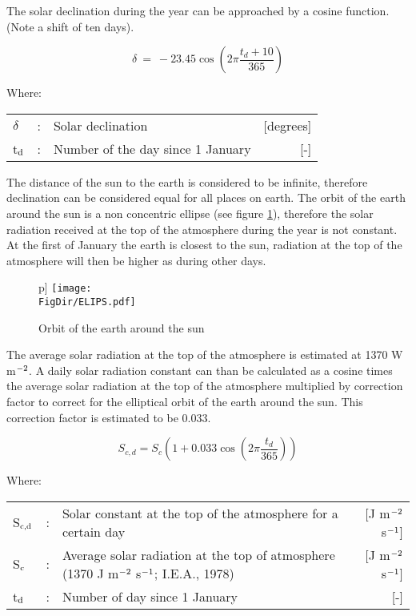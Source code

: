 The solar declination during the year can be approached by a cosine function. (Note a shift of ten days).

\begin{equation}
\delta ~=~ -23.45 \cos ( 2 \pi {\frac{t _{d} + 10}{365}} )
\end{equation}

Where:\\[5pt]
\begin{tabularx}{\textwidth}{llXr}
$\delta$ &:& Solar declination   & [de\-grees]\\
t$_{{\rm d}}$ &:& Number of the day since 1 January   & [-]\\
\end{tabularx}

The distance of the sun to the earth is considered to be infinite, therefore declination 
can be considered equal for all places on earth. The orbit of the earth around the sun is a
non concentric ellipse (see figure \ref{fig:orbit}), therefore the solar radiation received 
at the top of the atmosphere during the year is not constant. At the first of January the 
earth is closest to the sun, radiation at the top of the atmosphere will then be higher as 
during other days.

\begin{figure}p]
\centering
\texttt{[image: \\FigDir/ELIPS.pdf]}
\caption{Orbit of the earth around the sun}
\label{fig:orbit}
\end{figure}

The average solar radiation at the top of the atmosphere is estimated at 1370 W m$^{\rm -2}$. A daily solar radiation constant can than be calculated as a cosine times the average solar radiation at the top of the atmosphere multiplied by correction factor to correct for the elliptical orbit of the earth around the sun. This correction factor is estimated to be 0.033.

\begin{equation}
\label{eq:SolarConst}
S _{c,d} = S _{c} (1+0.033 \cos (2 \pi {\frac{t _{d} }{365}} ))
\end{equation}

Where:\\[5pt]
\begin{tabularx}{\textwidth}{llXr}
S$_{{\rm c,d}}$ &:& Solar constant at the top of the atmosphere for a certain day  & [J m$^{{\rm -2}}$ s$^{{\rm -1}}$]\\
S$_{{\rm c}}$ &:& Average solar radiation at the top of atmosphere (1370 J m$^{{\rm -2}}$ s$^{{\rm -1}}$; I.E.A., 1978) & [J m$^{{\rm -2}}$ s$^{{\rm -1}}$]\\
t$_{{\rm d}}$ &:& Number of day since 1 January  & [-]\\
\end{tabularx}


